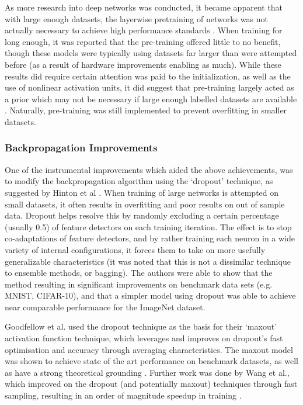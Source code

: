 \documentclass[a4paper,11pt,oneside]{article}
\theoremstyle{plain}
\theoremstyle{definition}
\begin{document}
As more research into deep networks was conducted, it became apparent that with large enough datasets, the
 layerwise pretraining of networks was not actually necessary to achieve high performance standards 
 \cite{ImageNet, Glorot2, Ciresan}. When training for long enough, it was reported that the pre-training offered little to no 
 benefit, though these models were typically using datasets far larger than were attempted before (as a result of
  hardware improvements enabling as much). While these results did require certain attention was paid to the 
  initialization, as well as the use of nonlinear activation units, it did suggest that pre-training largely acted as a prior 
  which may not be necessary if large enough labelled datasets are available \cite{Bengio3}. Naturally, pre-training was still 
  implemented to prevent overfitting in smaller datasets.
\hfill \break 

\subsubsection{Backpropagation Improvements}

One of the instrumental improvements which aided the above achievements, was to modify the backpropagation 
algorithm using the ‘dropout’ technique, as suggested by Hinton et al \cite{Hinton4}. When training of large networks is 
attempted on small datasets, it often results in overfitting and poor results on out of sample data. Dropout helps 
resolve this by randomly excluding a certain percentage (usually 0.5) of feature detectors on each training iteration. 
The effect is to stop co-adaptations of feature detectors, and by rather training each neuron in a wide variety of 
internal configurations, it forces them to take on more usefully generalizable characteristics (it was noted that this
is not a dissimilar technique to ensemble methods, or bagging). The authors were able to show that the method
resulting in significant improvements on benchmark data sets (e.g. MNIST, CIFAR-10), and that a simpler model 
using dropout was able to achieve near comparable performance for the ImageNet dataset.
\hfill \break 

Goodfellow et al. used the dropout technique as the basis for their ‘maxout’ activation function technique, which 
leverages and improves on dropout’s fast optimisation and accuracy through averaging characteristics. The 
maxout model was shown to achieve state of the art performance on benchmark datasets, as well as have a 
strong theoretical grounding \cite{Goodfellow}. Further work was done by Wang et al., which improved on the dropout 
(and potentially maxout) techniques through fast sampling, resulting in an order of magnitude speedup in
training \cite{Wang2}.
\hfill \break 
\end{document}
